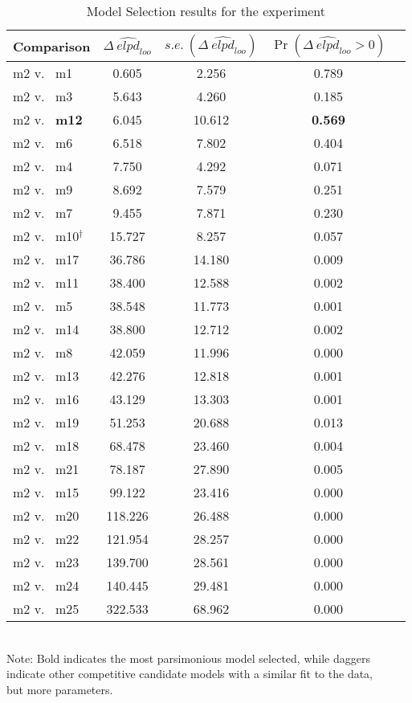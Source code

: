 \documentclass{article}
\begin{document}
\begin{table}[!ht]
\caption{Model Selection results for the  experiment}
\label{Table:Exp2ModComp}
\centering
\begin{tabular}{l c c c c} \hline
Comparison & $\Delta~\widehat{\textit{elpd}}_{\textit{loo}}$ & $s.e.~(\Delta~\widehat{\textit{elpd}}_{\textit{loo}})$ & $\Pr(\Delta~\widehat{\textit{elpd}}_{\textit{loo}} > 0)$ \\
\hline
m2 v.~ m1  & 0.605   & 2.256  & 0.789 \\
m2 v.~ m3  & 5.643   & 4.260  & 0.185 \\
m2 v.~ \textbf{m12} & 6.045   & 10.612 & \textbf{0.569} \\
m2 v.~ m6  & 6.518   & 7.802  & 0.404 \\
m2 v.~ m4  & 7.750   & 4.292  & 0.071 \\
m2 v.~ m9  & 8.692   & 7.579  & 0.251 \\
m2 v.~ m7  & 9.455   & 7.871  & 0.230 \\
m2 v.~ m10$^\dagger$ & 15.727  & 8.257  & 0.057 \\
m2 v.~ m17 & 36.786  & 14.180 & 0.009 \\
m2 v.~ m11 & 38.400  & 12.588 & 0.002 \\
m2 v.~ m5  & 38.548  & 11.773 & 0.001 \\
m2 v.~ m14 & 38.800  & 12.712 & 0.002 \\
m2 v.~ m8  & 42.059  & 11.996 & 0.000 \\
m2 v.~ m13 & 42.276  & 12.818 & 0.001 \\
m2 v.~ m16 & 43.129  & 13.303 & 0.001 \\
m2 v.~ m19 & 51.253  & 20.688 & 0.013 \\
m2 v.~ m18 & 68.478  & 23.460 & 0.004 \\
m2 v.~ m21 & 78.187  & 27.890 & 0.005 \\
m2 v.~ m15 & 99.122  & 23.416 & 0.000 \\
m2 v.~ m20 & 118.226 & 26.488 & 0.000 \\
m2 v.~ m22 & 121.954 & 28.257 & 0.000 \\
m2 v.~ m23 & 139.700 & 28.561 & 0.000 \\
m2 v.~ m24 & 140.445 & 29.481 & 0.000 \\
m2 v.~ m25 & 322.533 & 68.962 & 0.000 \\
\hline
\end{tabular}
\smallskip{} \\
{\footnotesize Note: Bold indicates the most parsimonious model selected, while daggers \\indicate other competitive candidate models with a similar fit to the data, \\but more parameters.}
\end{table}
\newpage
\end{document}
